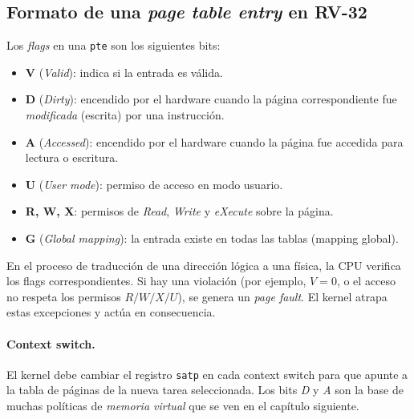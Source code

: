 \documentclass[11pt,a4paper]{article}
\begin{document}
\subsection{Formato de una \emph{page table entry} en RV-32}

\begin{center}
\end{center}

Los \emph{flags} en una \texttt{pte} son los siguientes bits:

\begin{itemize}[leftmargin=*]
    \item \textbf{V} (\emph{Valid}): indica si la entrada es válida.
    \item \textbf{D} (\emph{Dirty}): encendido por el hardware cuando la
        página correspondiente fue \emph{modificada} (escrita) por una
        instrucción.
    \item \textbf{A} (\emph{Accessed}): encendido por el hardware cuando
        la página fue accedida para lectura o escritura.
    \item \textbf{U} (\emph{User mode}): permiso de acceso en modo
        usuario.
    \item \textbf{R, W, X}: permisos de \emph{Read}, \emph{Write} y
        \emph{eXecute} sobre la página.
    \item \textbf{G} (\emph{Global mapping}): la entrada existe en
        todas las tablas (mapping global).
\end{itemize}

En el proceso de traducción de una dirección lógica a una física, la
CPU verifica los flags correspondientes. Si hay una violación (por
ejemplo, $V=0$, o el acceso no respeta los permisos $R/W/X/U$), se
genera un \emph{page fault}. El kernel atrapa estas excepciones y actúa
en consecuencia.

\paragraph{Context switch.}
El kernel debe cambiar el registro \texttt{satp} en cada context switch
para que apunte a la tabla de páginas de la nueva tarea seleccionada.
Los bits \emph{D} y \emph{A} son la base de muchas políticas de
\emph{memoria virtual} que se ven en el capítulo siguiente.
\end{document}
